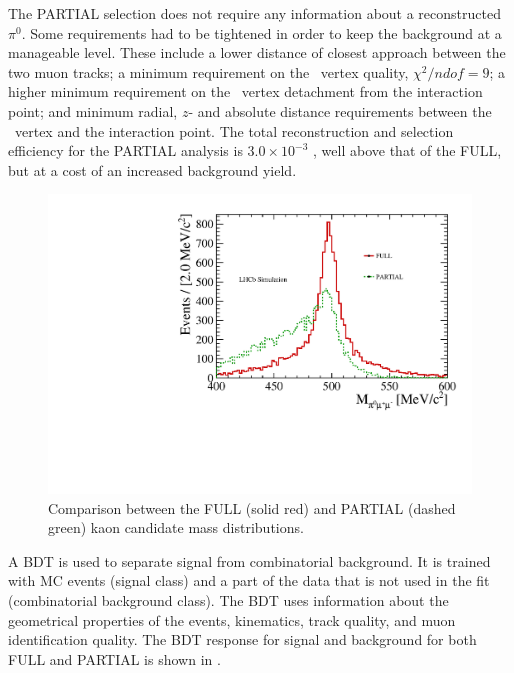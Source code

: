 The PARTIAL selection does not require any information about a reconstructed $\pi^0$. Some
requirements had to be tightened in order to keep the background at a manageable level. These include a lower distance of closest approach between the two
muon tracks; a minimum requirement on the \KS\ vertex quality, $\chi^{2}/ndof = 9$; a higher minimum requirement on the \KS\ vertex detachment from the interaction point;
and minimum radial, $z$- and absolute distance requirements between the \KS\ vertex and the interaction point.
The total reconstruction and selection efficiency for the PARTIAL analysis is $3.0\times 10^{-3}$ , well above that of the FULL,
but at a cost of an increased background yield.

\begin{figure} [htb!]
\begin{center}
\includegraphics[scale=0.6]{figs/Kspi0MuMu/M_V0_vs_VC.pdf}
\caption{Comparison between the FULL (solid red) and PARTIAL (dashed green) kaon candidate mass distributions. \label{fig:peaks}}
\end{center}
\end{figure}

A BDT is used to separate signal from combinatorial background. It is trained with MC events (signal class) and a part of the data that is not used in the fit
(combinatorial background class). The BDT uses information about the geometrical properties of the events,
kinematics, track quality, and muon identification quality. The BDT response for signal and background for both FULL and PARTIAL 
is shown in .


